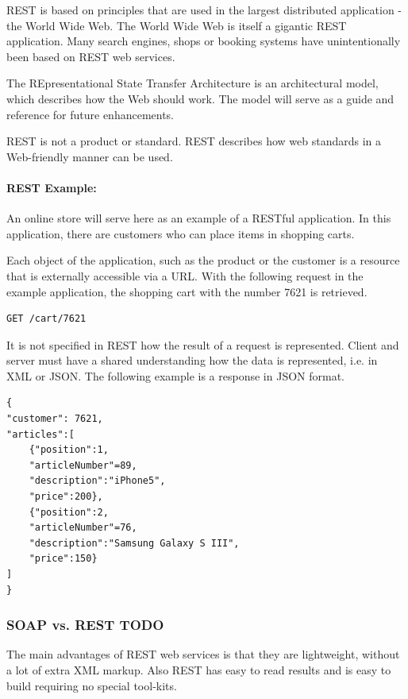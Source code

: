 REST is based on principles that are used in the largest distributed application - the World Wide Web. The World Wide Web is itself a gigantic REST application. Many search engines, shops or booking systems have unintentionally been based on REST web services.

The REpresentational State Transfer Architecture is an architectural model, which describes how the Web should work. The model will serve as a guide and reference for future enhancements.

REST is not a product or standard. REST describes how web standards in a Web-friendly manner can be used.


\paragraph{REST Example:} An online store will serve here as an example of a RESTful application. In this application, there are customers who can place items in shopping carts.

Each object of the application, such as the product or the customer is a resource that is externally accessible via a URL. With the following request in the example application, the shopping cart with the number 7621 is retrieved.

\begin{lstlisting}
GET /cart/7621
\end{lstlisting}

It is not specified in REST how the result of a request is represented. Client and server must have a shared understanding how the data is represented, i.e. in XML or JSON. The following example is a response in JSON format.

\begin{lstlisting}
{
"customer": 7621,
"articles":[
	{"position":1,
	"articleNumber"=89,
	"description":"iPhone5",
	"price":200},
	{"position":2,
	"articleNumber"=76,
	"description":"Samsung Galaxy S III",
	"price":150}
]
}
\end{lstlisting}

\subsubsection{SOAP vs. REST TODO\label{sec:back_soap_vs_rest}}

The main advantages of REST web services is that they are lightweight, without a lot of extra XML markup. Also REST has easy to read results and is easy to build requiring no special tool-kits.

